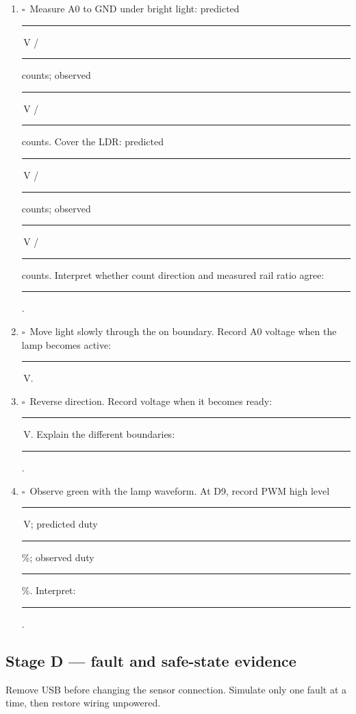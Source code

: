 \documentclass[11pt]{article}
\newcommand{\checkbox}{\(\square\)}
\newcommand{\blank}[1]{\rule{#1}{0.4pt}}
\begin{document}
\begin{enumerate}
  \item \checkbox\ Measure A0 to GND under bright light:
        predicted \blank{.55in}\,V / \blank{.55in} counts; observed
        \blank{.55in}\,V / \blank{.55in} counts. Cover the LDR:
        predicted \blank{.55in}\,V / \blank{.55in} counts; observed
        \blank{.55in}\,V / \blank{.55in} counts. Interpret whether count
        direction and measured rail ratio agree: \blank{2.0in}.
  \item \checkbox\ Move light slowly through the on boundary. Record A0 voltage
        when the lamp becomes active: \blank{.7in}\,V.
  \item \checkbox\ Reverse direction. Record voltage when it becomes ready:
        \blank{.7in}\,V. Explain the different boundaries:
        \blank{3.0in}.
  \item \checkbox\ Observe green with the lamp waveform. At D9, record PWM
        high level \blank{.6in}\,V; predicted duty \blank{.6in}\%;
        observed duty \blank{.6in}\%. Interpret: \blank{1.5in}.
\end{enumerate}

\subsection{Stage D --- fault and safe-state evidence}

Remove USB before changing the sensor connection. Simulate only one fault at a
time, then restore wiring unpowered.
\end{document}

